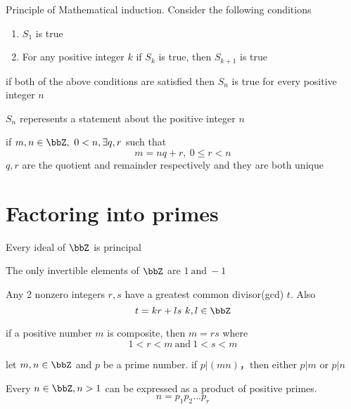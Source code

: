 \documentclass[11pt, oneside, dvipdfmx]{book}
\begin{document}
\begin{MyTheorem}
Principle of Mathematical induction. \newline Consider the following conditions
\begin{enumerate}
\item $S_1$ is true
\item For any positive integer $k$ if $S_{k}$ is true, then $S_{k+1}$ is true
\end{enumerate}
if both of the above conditions are satisfied then $S_n$ is true for every positive integer $n$
\end{MyTheorem}
\begin{description}
\item $S_n$ reperesents a statement about the positive integer $n$
\end{description}

\begin{MyTheorem}
if $m,n \in \bbZ,~0 < n, \exists q,r $ such that
$$m =nq +r,~0 \leq r < n$$
$q,r$ are the  quotient and remainder respectively and they are both unique
\end{MyTheorem}
\section{Factoring into primes} 

\begin{MyTheorem}
Every ideal of $\bbZ$ is principal
\end{MyTheorem}

\begin{MyTheorem}
The only invertible elements of $\bbZ$ are $1 ~\text{and}~ -1$
\end{MyTheorem}

\begin{MyTheorem}
Any 2 nonzero integers $r,s$ have a greatest common divisor(gcd) $t$. Also
$$ t = kr + ls ~ k,l \in \bbZ$$ 
\end{MyTheorem}


\begin{lemma}
if a positive number $m$ is composite, then $m=rs$ where
$$ 1 < r <m ~\text{and} ~ 1 < s < m$$
\end{lemma}

\begin{lemma}
let $m,n \in \bbZ$ and $p$ be a prime number. if $p |(mn)$，then either $p|m$ or $p|n$
\end{lemma}

\begin{MyTheorem}
Every $n \in \bbZ, n>1$ can be expressed as a product of positive primes.$$ n= p_1p_2...p_r$$
\end{MyTheorem}
\end{document}
